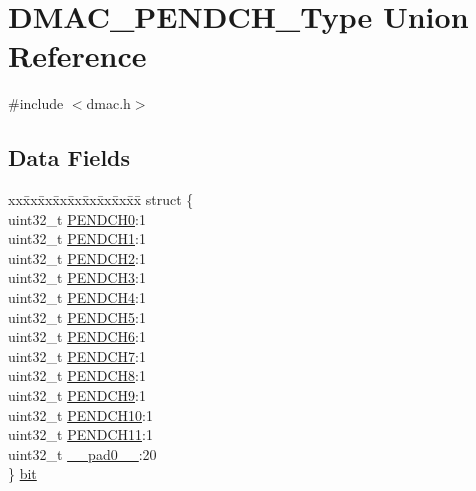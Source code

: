 \hypertarget{union_d_m_a_c___p_e_n_d_c_h___type}{}\section{D\+M\+A\+C\+\_\+\+P\+E\+N\+D\+C\+H\+\_\+\+Type Union Reference}
\label{union_d_m_a_c___p_e_n_d_c_h___type}


{\ttfamily \#include $<$dmac.\+h$>$}

\subsection*{Data Fields}
\begin{DoxyCompactItemize}
\item 
\begin{tabbing}
xx\=xx\=xx\=xx\=xx\=xx\=xx\=xx\=xx\=\kill
struct \{\\
\>uint32\_t \mbox{\hyperlink{union_d_m_a_c___p_e_n_d_c_h___type_a783c312e00ef41c4442c4704e1b6fa31}{PENDCH0}}:1\\
\>uint32\_t \mbox{\hyperlink{union_d_m_a_c___p_e_n_d_c_h___type_a0f69a2de1f90b856e0d60c9833421c75}{PENDCH1}}:1\\
\>uint32\_t \mbox{\hyperlink{union_d_m_a_c___p_e_n_d_c_h___type_aa1d0727e5c86369bfd0641641379c3be}{PENDCH2}}:1\\
\>uint32\_t \mbox{\hyperlink{union_d_m_a_c___p_e_n_d_c_h___type_a3b40107461f0cf59426be213d00abb4b}{PENDCH3}}:1\\
\>uint32\_t \mbox{\hyperlink{union_d_m_a_c___p_e_n_d_c_h___type_a848fb48bc3134ef02e7445be7d9f9d28}{PENDCH4}}:1\\
\>uint32\_t \mbox{\hyperlink{union_d_m_a_c___p_e_n_d_c_h___type_a3f5d090f3e45945eb40a67de4000f4fe}{PENDCH5}}:1\\
\>uint32\_t \mbox{\hyperlink{union_d_m_a_c___p_e_n_d_c_h___type_a8ce43e232c18b5ed2c47a9e022931bc0}{PENDCH6}}:1\\
\>uint32\_t \mbox{\hyperlink{union_d_m_a_c___p_e_n_d_c_h___type_a6f2ff7643ba469cccb9e2d8bc3279ba7}{PENDCH7}}:1\\
\>uint32\_t \mbox{\hyperlink{union_d_m_a_c___p_e_n_d_c_h___type_aa2ba2e7e0aae14ee5c864c67b1d1a9cd}{PENDCH8}}:1\\
\>uint32\_t \mbox{\hyperlink{union_d_m_a_c___p_e_n_d_c_h___type_a9b6102a0e381908726a91959710e33b3}{PENDCH9}}:1\\
\>uint32\_t \mbox{\hyperlink{union_d_m_a_c___p_e_n_d_c_h___type_aec84dfad08de40293d644a6f223c4cf9}{PENDCH10}}:1\\
\>uint32\_t \mbox{\hyperlink{union_d_m_a_c___p_e_n_d_c_h___type_a4d21b1e1cea680665bfbb57b8fd88e22}{PENDCH11}}:1\\
\>uint32\_t \mbox{\hyperlink{union_d_m_a_c___p_e_n_d_c_h___type_a3e57c2ef1c3ffb36722f000cc1156824}{\_\_pad0\_\_}}:20\\
\} \mbox{\hyperlink{union_d_m_a_c___p_e_n_d_c_h___type_a150c646ea14d8d0288c0a9b5ae1c17c2}{bit}}\\


\end{tabbing}
\end{DoxyCompactItemize}
